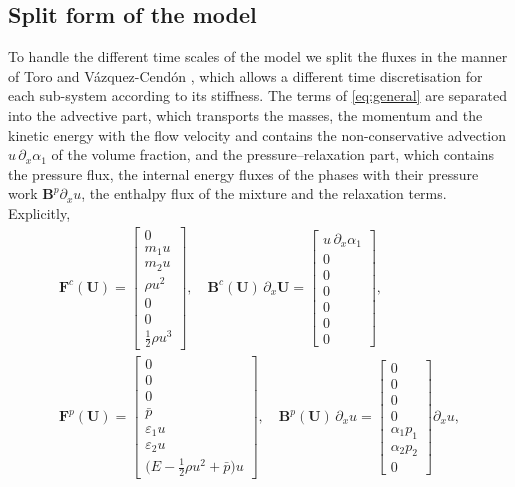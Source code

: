 \subsection{Split form of the model}
\label{sec:split}
To handle the different time scales of the model we split the fluxes in the manner of Toro and V\'azquez-Cend\'on
\cite{ToroVazquez2012}, which allows a different time discretisation for each sub-system according to its stiffness. The terms
of \eqref{eq:general} are separated into the advective part, which transports the masses, the momentum and the kinetic
energy with the flow velocity and contains the non-conservative advection $u\,\partial_x\alpha_1$ of the volume fraction, and the
pressure--relaxation part, which contains the pressure flux, the internal energy fluxes of the phases with their pressure work
$\mathbf B^p\partial_xu$, the enthalpy flux of the mixture and the relaxation terms. Explicitly,
\begin{equation}
\begin{gathered}
\mathbf F^c(\mathbf U)=\begin{bmatrix}0\\ m_1u\\ m_2u\\ \rho u^2\\ 0\\ 0\\ \tfrac12\rho u^3\end{bmatrix},\quad
\mathbf B^c(\mathbf U)\,\partial_x\mathbf U=\begin{bmatrix}u\,\partial_x\alpha_1\\0\\0\\0\\0\\0\\0\end{bmatrix},\\
\mathbf F^p(\mathbf U)=\begin{bmatrix}0\\0\\0\\ \bar p\\ \varepsilon_1u\\ \varepsilon_2u\\ \big(E-\tfrac12\rho u^2+\bar p\big)u\end{bmatrix},\quad
\mathbf B^p(\mathbf U)\,\partial_xu=\begin{bmatrix}0\\0\\0\\0\\ \alpha_1p_1\\ \alpha_2p_2\\0\end{bmatrix}\partial_xu ,
\end{gathered}
\label{eq:split_fluxes}
\end{equation}
